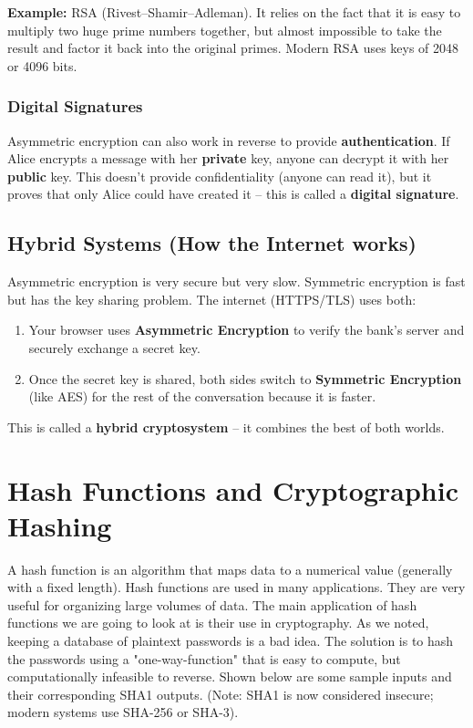 \documentclass[11pt,a4paper]{report}
\begin{document}
\textbf{Example:} RSA (Rivest--Shamir--Adleman). It relies on the fact that it is easy to multiply two huge prime numbers together, but almost impossible to take the result and factor it back into the original primes. Modern RSA uses keys of 2048 or 4096 bits.

\subsubsection{Digital Signatures}

Asymmetric encryption can also work in reverse to provide \textbf{authentication}. If Alice encrypts a message with her \textbf{private} key, anyone can decrypt it with her \textbf{public} key. This doesn't provide confidentiality (anyone can read it), but it proves that only Alice could have created it -- this is called a \textbf{digital signature}.

\subsection{Hybrid Systems (How the Internet works)}
Asymmetric encryption is very secure but very slow. Symmetric encryption is fast but has the key sharing problem.
The internet (HTTPS/TLS) uses both:
\begin{enumerate}
    \item Your browser uses \textbf{Asymmetric Encryption} to verify the bank's server and securely exchange a secret key.
    \item Once the secret key is shared, both sides switch to \textbf{Symmetric Encryption} (like AES) for the rest of the conversation because it is faster.
\end{enumerate}

This is called a \textbf{hybrid cryptosystem} -- it combines the best of both worlds.

\newpage
\section{Hash Functions and Cryptographic Hashing}

A hash function is an algorithm that maps data to a numerical value (generally with a fixed length).
Hash functions are used in many applications. They are very useful for organizing large volumes of data.
The main application of hash functions we are going to look at is their use in cryptography.
As we noted, keeping a database of plaintext passwords is a bad idea.
The solution is to hash the passwords using a "one-way-function" that is easy to compute, but computationally infeasible to reverse.
Shown below are some sample inputs and their corresponding SHA1 outputs. (Note: SHA1 is now considered insecure; modern systems use SHA-256 or SHA-3).
\end{document}
